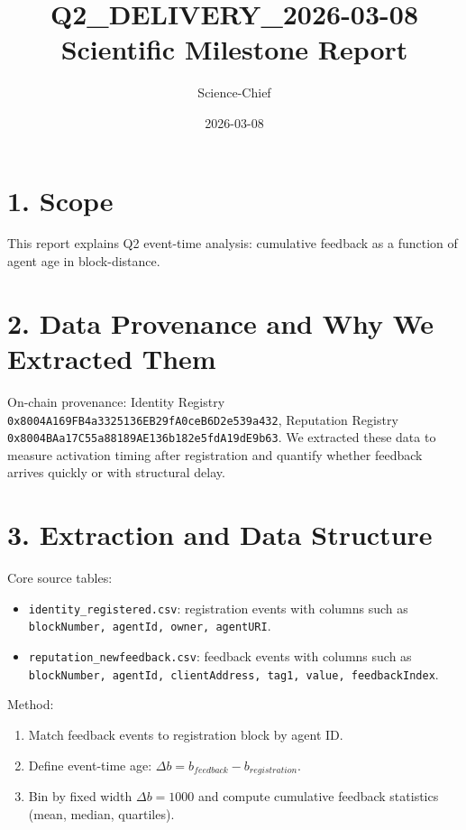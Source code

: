 \documentclass[11pt,a4paper]{article}
\title{Q2\_DELIVERY\_2026-03-08\\Scientific Milestone Report}
\author{Science-Chief}
\date{2026-03-08}
\begin{document}
\maketitle

\section*{1. Scope}
This report explains Q2 event-time analysis: cumulative feedback as a function of agent age in block-distance.

\section*{2. Data Provenance and Why We Extracted Them}
On-chain provenance:
Identity Registry \texttt{0x8004A169FB4a3325136EB29fA0ceB6D2e539a432}, Reputation Registry \texttt{0x8004BAa17C55a88189AE136b182e5fdA19dE9b63}.
We extracted these data to measure activation timing after registration and quantify whether feedback arrives quickly or with structural delay.

\section*{3. Extraction and Data Structure}
Core source tables:
\begin{itemize}
\item \texttt{identity\_registered.csv}: registration events with columns such as \texttt{blockNumber, agentId, owner, agentURI}.
\item \texttt{reputation\_newfeedback.csv}: feedback events with columns such as \texttt{blockNumber, agentId, clientAddress, tag1, value, feedbackIndex}.
\end{itemize}
Method:
\begin{enumerate}
\item Match feedback events to registration block by agent ID.
\item Define event-time age: $\Delta b = b_{feedback} - b_{registration}$.
\item Bin by fixed width $\Delta b=1000$ and compute cumulative feedback statistics (mean, median, quartiles).
\end{enumerate}
\end{document}
